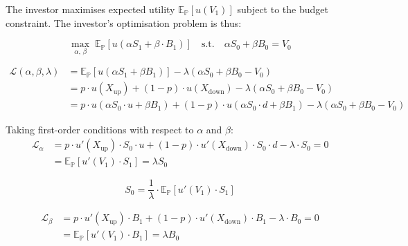 \documentclass[12pt, a4paper]{article}
\begin{document}
\noindent The investor maximises expected utility $\mathbb{E}_{\mathbb{P}}[u(V_1)]$ subject to the budget 
constraint. The investor's optimisation problem is thus:

\[
\max_{\alpha,\, \beta} \; \mathbb{E}_{\mathbb{P}}\left[u\!\left(\alpha S_1 + \beta \cdot B_1\right)\right]
\quad \text{s.t.} \quad
\alpha S_0 + \beta B_0 = V_0
\]
\vspace{0.1em}

\vspace{0.1em}

\begin{align*}
\mathcal{L}(\alpha, \beta, \lambda)
  &= \mathbb{E}_{\mathbb{P}}\left[u\!\left(\alpha S_1 + \beta B_1\right)\right]
     - \lambda\!\left(\alpha S_0 + \beta B_0 - V_0\right) \\[6pt]
  &= p \cdot u(X_{\text{up}}) + (1-p) \cdot u(X_{\text{down}})
     - \lambda\!\left(\alpha S_0 + \beta B_0 - V_0\right) \\[6pt]
  &= p \cdot u(\alpha S_0 \cdot u + \beta B_1)
     + (1-p) \cdot u(\alpha S_0 \cdot d + \beta B_1)
     - \lambda\!\left(\alpha S_0 + \beta B_0 - V_0\right)
\end{align*}

\vspace{1em}

\noindent Taking first-order conditions with respect to $\alpha$ and $\beta$:
\begin{align*}
\mathcal{L}_\alpha
  &= p \cdot u'(X_{\text{up}}) \cdot S_0 \cdot u + (1-p) \cdot u'(X_{\text{down}}) \cdot S_0 \cdot d
     - \lambda \cdot S_0 = 0
  \\[4pt]
  &= \mathbb{E}_{\mathbb{P}}\left[u'(V_1) \cdot S_1\right] = \lambda S_0
\end{align*}

\[
S_0 = \frac{1}{\lambda} \cdot \mathbb{E}_{\mathbb{P}}\left[u'(V_1) \cdot S_1\right]
\tag{I}
\]

\vspace{2em}

\begin{align*}
\mathcal{L}_\beta
  &= p \cdot u'(X_{\text{up}}) \cdot B_1 + (1-p) \cdot u'(X_{\text{down}}) \cdot B_1
     - \lambda \cdot B_0 = 0
  \\[4pt]
  &= \mathbb{E}_{\mathbb{P}}\left[u'(V_1) \cdot B_1\right] = \lambda B_0
\end{align*} 
\end{document}
